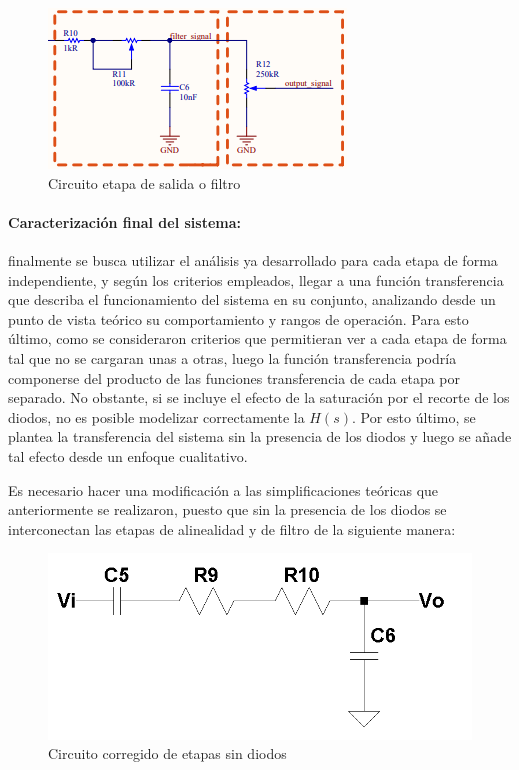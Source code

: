 \begin{figure}[H]
    \centering
    \includegraphics[]{../EJ5/Recursos/circuito_salida.PNG}
    \caption{Circuito etapa de salida o filtro}
    \label{fig:circuito_filtro}
\end{figure}

\paragraph*{Caracterizaci\'on final del sistema:} finalmente se busca utilizar el an\'alisis ya desarrollado para cada etapa de forma independiente, y seg\'un los criterios empleados, llegar a una funci\'on transferencia que describa el funcionamiento
del sistema en su conjunto, analizando desde un punto de vista te\'orico su comportamiento y rangos de operaci\'on. Para esto \'ultimo, como se consideraron criterios que permitieran ver a cada etapa de forma tal que no se cargaran unas a otras, luego la funci\'on transferencia
podr\'ia componerse del producto de las funciones transferencia de cada etapa por separado. No obstante, si se incluye el efecto de la saturaci\'on por el recorte de los diodos, no es posible modelizar correctamente la $H(s)$. Por esto \'ultimo, se plantea la transferencia del sistema
sin la presencia de los diodos y luego se añade tal efecto desde un enfoque cualitativo.

Es necesario hacer una modificaci\'on a las simplificaciones te\'oricas que anteriormente se realizaron, puesto que sin la presencia de los diodos se interconectan las etapas de alinealidad y de filtro de la siguiente manera:

\begin{figure}[H]
    \centering
    \includegraphics[scale=0.4]{../EJ5/Recursos/circuito_correccion.PNG}
    \caption{Circuito corregido de etapas sin diodos}
    \label{fig:circuito_sin_diodos_pedal}
\end{figure}


